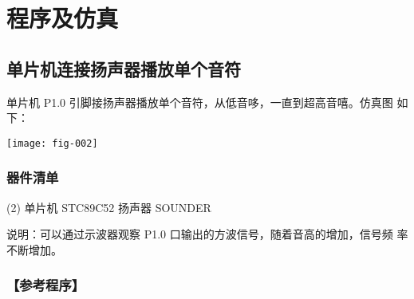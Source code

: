 \documentclass{swfulabreport}
\begin{document}
\maketitle %

\chapter{程序及仿真}

\section{单片机连接扬声器播放单个音符}

单片机 P1.0 引脚接扬声器播放单个音符，从低音哆，一直到超高音嘻。仿真图
如下：

\begin{center}
  \texttt{[image: fig-002]}
\end{center}

\subsection{器件清单}

\begin{tasks}(2)
  \task 单片机 STC89C52
  \task 扬声器 SOUNDER
\end{tasks}

说明：可以通过示波器观察 P1.0 口输出的方波信号，随着音高的增加，信号频
率不断增加。

\subsection{【参考程序】}
\end{document}
